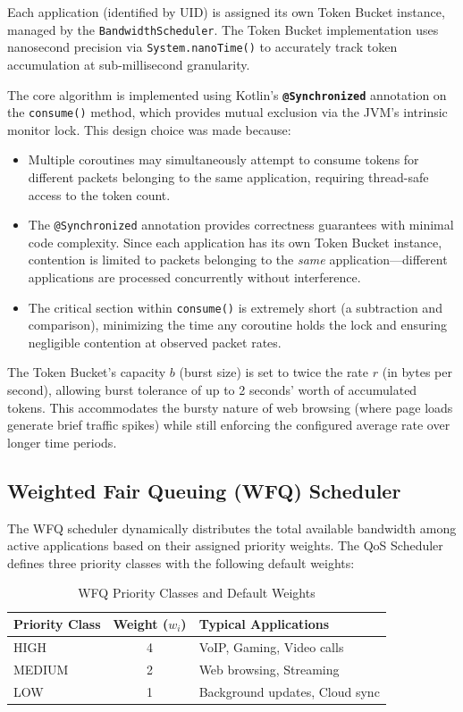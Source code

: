 Each application (identified by UID) is assigned its own Token Bucket instance, managed by the \texttt{BandwidthScheduler}. The Token Bucket implementation uses nanosecond precision via \texttt{System.nanoTime()} to accurately track token accumulation at sub-millisecond granularity.

The core algorithm is implemented using Kotlin's \textbf{\texttt{@Synchronized}} annotation on the \texttt{consume()} method, which provides mutual exclusion via the JVM's intrinsic monitor lock. This design choice was made because:

\begin{itemize}[noitemsep]
    \item Multiple coroutines may simultaneously attempt to consume tokens for different packets belonging to the same application, requiring thread-safe access to the token count.
    \item The \texttt{@Synchronized} annotation provides correctness guarantees with minimal code complexity. Since each application has its own Token Bucket instance, contention is limited to packets belonging to the \textit{same} application---different applications are processed concurrently without interference.
    \item The critical section within \texttt{consume()} is extremely short (a subtraction and comparison), minimizing the time any coroutine holds the lock and ensuring negligible contention at observed packet rates.
\end{itemize}

The Token Bucket's capacity $b$ (burst size) is set to twice the rate $r$ (in bytes per second), allowing burst tolerance of up to 2 seconds' worth of accumulated tokens. This accommodates the bursty nature of web browsing (where page loads generate brief traffic spikes) while still enforcing the configured average rate over longer time periods.

\subsection{Weighted Fair Queuing (WFQ) Scheduler}

The WFQ scheduler dynamically distributes the total available bandwidth among active applications based on their assigned priority weights. The QoS Scheduler defines three priority classes with the following default weights:

\begin{table}[H]
\centering
\caption{WFQ Priority Classes and Default Weights}
\label{tab:wfq_weights}
\begin{tabular}{lcl}
\toprule
\textbf{Priority Class} & \textbf{Weight ($w_i$)} & \textbf{Typical Applications} \\
\midrule
HIGH   & 4 & VoIP, Gaming, Video calls \\
MEDIUM & 2 & Web browsing, Streaming \\
LOW    & 1 & Background updates, Cloud sync \\
\bottomrule
\end{tabular}
\end{table}

